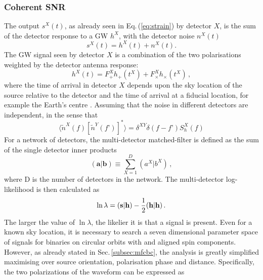 \documentclass[binding=0.6cm, LaM]{sapthesis}
\begin{document}
\subsubsection{Coherent SNR}	
	The output $s^X(t)$, as already seen in Eq.\,(\ref{eq:strain}) by detector $X$,  
	is the sum of the detector response to a GW $h^X$,
	with the detector noise $n^X(t)$
		\begin{equation}
			s^X(t) = h^X(t) + n^X(t).
		\end{equation}
	The GW signal seen by detector $X$ is a combination of
        the two polarisations weighted by the detector antenna
        response:
                \begin{equation}
		\label{eq:gwsignal}
                        h^X(t) = F_{+}^X h_{+}(t^X) + F_{\times}^X h_{\times}(t^X)\,, 
                \end{equation}
        where the time of arrival in detector $X$ depends upon the sky location
        of the source relative to the detector and the time of arrival at a fiducial location,
        for example the Earth’s centre \cite{45}.
	Assuming that the noise in different detectors are independent, in the sense that 
		\begin{equation}
			\langle \tilde{n}^X(f)[ \tilde{n}^Y(f’)]^*\rangle = \delta^{XY}\delta(f-f’)S_h^X(f)
		\end{equation}
        For a network of detectors, the multi-detector matched-filter
        is defined as the sum of the single detector inner products
                \begin{equation}
                        (\textbf{a}|\textbf{b}) \equiv \sum^D_{X=1} (a^X|b^X)\,,
                \end{equation}
        where D is the number of detectors in the network. The multi-detector log-likelihood is then calculated as
                \begin{equation}
                        \ln \lambda = (\textbf{s}|\textbf{h}) - {1 \over 2} (\textbf{h}|\textbf{h})\,.
                \end{equation}
        The larger the value of $\ln \lambda$, the likelier it is that a signal is present.
	Even for a known sky location, it is necessary to search a seven 
	dimensional parameter space of signals for binaries on circular orbits with and aligned spin components.
	However, as already stated in Sec.\,\ref{subsec:mfcbc}, the analysis is greatly simplified 
	maximising over source orientation, polarisation phase and distance.
	Specifically, the two polarizations of the waveform can be expressed as 
\end{document}
